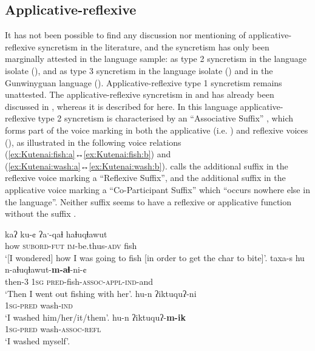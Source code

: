 \subsection{Applicative-reflexive} \label{sec:simple-syncretism:appl-refl}
It has not been possible to find any discussion nor mentioning of applicative-reflexive syncretism in the literature, and the syncretism has only been marginally attested in the language sample: as type 2 syncretism in the language isolate  (), and as type 3 syncretism in the language isolate  () and in the Gunwinyguan language  (). Applicative-reflexive type 1 syncretism remains unattested. The applicative-reflexive syncretism in  and  has already been discussed in , whereas it is described for  here. In this language applicative-reflexive type 2 syncretism is characterised by an “Associative Suffix”  \citep[209]{morgan:1991}, which forms part of the voice marking in both the applicative (i.e. ) and reflexive voices (), as illustrated in the following voice relations (\ref{ex:Kutenai:fish:a}↔\ref{ex:Kutenai:fish:b}) and (\ref{ex:Kutenai:wash:a}↔\ref{ex:Kutenai:wash:b}). \citet[313, 321]{morgan:1991} calls the additional suffix  in the reflexive voice marking a “Reflexive Suffix”, and the additional suffix  in the applicative voice marking a “Co-Participant Suffix” which “occurs nowhere else in the language”. Neither suffix seems to have a reflexive or applicative function without the suffix . 

\ea {} \citep[292, 313, 363, 381]{morgan:1991}
\ea\label{ex:Kutenai:fish:a}
	\gll	kaʔ ku-¢ ʔaˑ-qaɬ haɬuqɬawut \\
			how \textsc{subord-fut} \textsc{im}-be.thus-\textsc{adv} fish \\
	\glt	‘[I wondered] how I was going to fish [in order to get the char to bite]’. 
\ex\label{ex:Kutenai:fish:b}
	\gll	taxa-s hu n-aɬuqɬawut-\textbf{m-aɬ}-ni-¢ \\
			then-\textsc{3} \textsc{1sg} \textsc{pred}-fish-\textsc{assoc-appl-ind}-and \\
	\glt	‘Then I went out fishing with her’. 
\ex\label{ex:Kutenai:wash:a}
	\gll	hu-n ʔiktuquʔ-ni \\
			\textsc{1sg-pred} wash-\textsc{ind} \\
	\glt	‘I washed him/her/it/them’. 
\ex\label{ex:Kutenai:wash:b}
	\gll	hu-n ʔiktuquʔ-\textbf{m-ik} \\
			\textsc{1sg-pred} wash-\textsc{assoc-refl} \\
	\glt	‘I washed myself’. 
	\z 
\z



